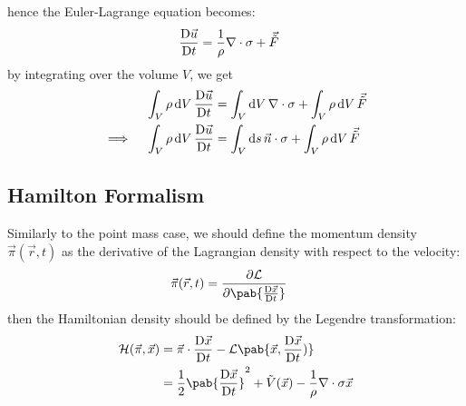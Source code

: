 hence the Euler-Lagrange equation becomes:
\begin{align}
  \mdv{\vec{u}}{t} & = \frac{1}{\rho} \nabla \cdot \sigma + \vec{\tilde{F}}
\end{align}
by integrating over the volume $V$, we get
\begin{align}
  \int_V \rho \odif{V} \, \mdv{\vec{u}}{t}                & = \int_V \odif{V} \, \nabla \cdot \sigma + \int_V \rho \odif{V} \, \vec{\tilde{F}}  \\
  \implies \quad \int_V \rho \odif{V} \, \mdv{\vec{u}}{t} & = \int_V \odif{s} \, \vec{n} \cdot \sigma + \int_V \rho \odif{V} \, \vec{\tilde{F}}
\end{align}


\subsection{Hamilton Formalism}
Similarly to the point mass case, we should define the momentum density $\vec{\pi}(\vec{r}, t)$ as the derivative of the Lagrangian density with respect to the velocity:
\begin{align}
  \vec{\pi} (\vec{r}, t) & = \pdv{\lagr}{\pab{\mdv{\vec{x}}{t}}}
\end{align}
then the Hamiltonian density should be defined by the Legendre transformation:
\begin{align}
  \hami(\vec{\pi}, \vec{x}) & = \vec{\pi} \cdot \mdv{\vec{x}}{t} - \lagr \pab{\vec{x}, \mdv{\vec{x}}{t})}                              \\
                            & = \frac{1}{2} \pab{\mdv{\vec{x}}{t}}^2 + \tilde{V}(\vec{x}) - \frac{1}{\rho} \nabla \cdot \sigma \vec{x}
\end{align}




\cite{suzuki-leastActionFluid}




